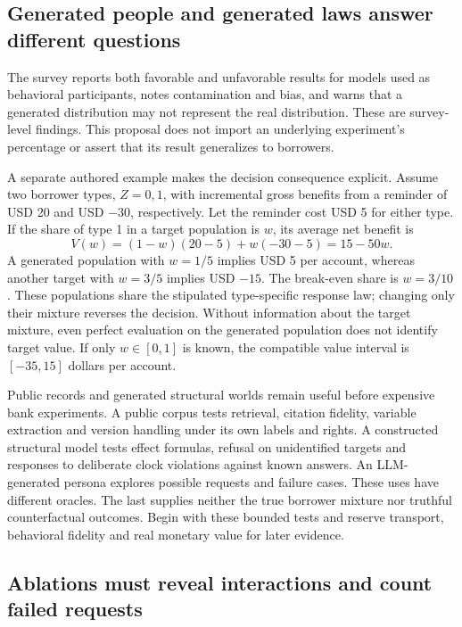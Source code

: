 \subsection{Generated people and generated laws answer different questions}

The survey reports both favorable and unfavorable results for models used as
behavioral participants, notes contamination and bias, and warns that a generated
distribution may not represent the real distribution. These are survey-level
findings. This proposal does not import an underlying experiment's percentage
or assert that its result generalizes to borrowers.
\citep{exec24_llmchallenges_original}

A separate authored example makes the decision consequence explicit. Assume two
borrower types, $Z=0,1$, with incremental gross benefits from a reminder of USD 20
and USD $-30$, respectively. Let the reminder cost USD 5 for either type. If the
share of type 1 in a target population is $w$, its average net benefit is
\[
 V(w)=(1-w)(20-5)+w(-30-5)=15-50w.
\]
A generated population with $w=1/5$ implies USD 5 per account, whereas another
target with $w=3/5$ implies USD $-15$. The break-even share is $w=3/10$.
These populations share the stipulated type-specific response law; changing only
their mixture reverses the decision. Without information about the target
mixture, even perfect evaluation on the generated population does not identify
target value. If only $w\in[0,1]$ is known, the compatible value interval is
$[-35,15]$ dollars per account.\citep{exec24_llmchallenges_reference}

Public records and generated structural worlds remain useful before expensive
bank experiments. A public corpus tests retrieval, citation fidelity, variable
extraction and version handling under its own labels and rights. A constructed
structural model tests effect formulas, refusal on unidentified targets and
responses to deliberate clock violations against known answers. An LLM-generated
persona explores possible requests and failure cases. These uses have different
oracles. The last supplies neither the true borrower mixture nor truthful
counterfactual outcomes. Begin with these bounded tests and reserve transport,
behavioral fidelity and real monetary value for later evidence.

\subsection{Ablations must reveal interactions and count failed requests}

